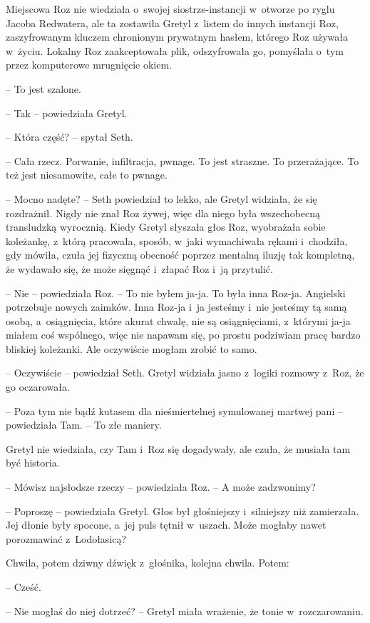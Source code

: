 \documentclass[oneside,polish,11pt,sfheadings]{mwbk}
\begin{document}
Miejscowa Roz nie wiedziała o~swojej siostrze-instancji w~otworze po
ryglu Jacoba Redwatera, ale ta zostawiła Gretyl z~listem do innych
instancji Roz, zaszyfrowanym kluczem chronionym prywatnym hasłem,
którego Roz używała w~życiu. Lokalny Roz zaakceptowała plik,
odszyfrowała go, pomyślała o~tym przez komputerowe mrugnięcie okiem. 

-- To jest szalone.

-- Tak -- powiedziała Gretyl.

-- Która część? -- spytał Seth.

-- Cała rzecz. Porwanie, infiltracja, pwnage. To jest straszne. To
przerażające. To też jest niesamowite, całe to pwnage.

-- Mocno nadęte? -- Seth powiedział to lekko, ale Gretyl widziała, że się
rozdrażnił. Nigdy nie znał Roz żywej, więc dla niego była wszechobecną
transludzką wyrocznią. Kiedy Gretyl słyszała głos Roz, wyobrażała sobie
koleżankę, z~którą pracowała, sposób, w~jaki wymachiwała rękami i~chodziła, gdy mówiła, czuła jej fizyczną obecność poprzez mentalną
iluzję tak kompletną, że wydawało się, że może sięgnąć i~złapać Roz i~ją
przytulić.

-- Nie -- powiedziała Roz. -- To nie byłem ja-ja. To była inna Roz-ja.
Angielski potrzebuje nowych zaimków. Inna Roz-ja i~ja jesteśmy i~nie
jesteśmy tą samą osobą, a~osiągnięcia, które akurat chwalę, nie są
osiągnięciami, z~którymi ja-ja miałem coś wspólnego, więc nie napawam
się, po prostu podziwiam pracę bardzo bliskiej koleżanki. Ale oczywiście
mogłam zrobić to samo.

-- Oczywiście -- powiedział Seth. Gretyl widziała jasno z~logiki rozmowy z~Roz, że go oczarowała.

-- Poza tym nie bądź kutasem dla nieśmiertelnej symulowanej martwej pani
-- powiedziała Tam. -- To złe maniery.

Gretyl nie wiedziała, czy Tam i~Roz się dogadywały, ale czuła, że
musiała tam być historia.

-- Mówisz najsłodsze rzeczy -- powiedziała Roz. -- A może zadzwonimy?

-- Poproszę -- powiedziała Gretyl. Głos był głośniejszy i~silniejszy niż
zamierzała. Jej dłonie były spocone, a~jej puls tętnił w~uszach. Może
mogłaby nawet porozmawiać z~Lodołasicą?

Chwila, potem dziwny dźwięk z~głośnika, kolejna chwila. Potem: 

-- Cześć.

-- Nie mogłaś do niej dotrzeć? -- Gretyl miała wrażenie, że tonie w~rozczarowaniu.
\end{document}
